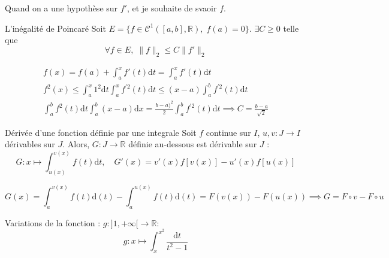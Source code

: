\begin{note}{}{}
  Quand on a une hypothèse sur $f'$, et je souhaite de svaoir $f$.
\end{note}


\begin{Example}{L'inégalité de Poincaré}{}
  Soit $E = \{ f \in \mathcal{C} ^{1}([a,b], \mathbb{R}), \; f(a) = 0\}$. $\exists C \ge 0$ telle que 
  \begin{equation}
    \forall f \in E, \; \| f \| _{2} \le C \| f' \|_2
  \end{equation}

\end{Example}

\begin{myproof}{}{}
\begin{gather}
  f(x) = f(a) + \int_{a}^{x} f'(t) \mathrm{d} t = \int_{a}^{x} f'(t) \mathrm{d}t \\ 
  f ^{2}(x) \le \int_{a}^{x} 1 ^{2} \mathrm{d} t \int_{a}^{x} f^{'2}(t) \mathrm{d} t \le (x-a) \int_{a}^{b} f ^{'2}(t) \mathrm{d} t \\ 
  \int_{a}^{b} f ^{2}(t) \mathrm{d} t \int_{a}^{b}(x-a) \mathrm{d}x  = \frac{b-a) ^{2}}{2}  \int_{a}^{b} f ^{'2}(t) \mathrm{d} t \implies C = \frac{b-a}{\sqrt{2}} 
\end{gather} 
\end{myproof}

\begin{Theorem}{Dérivée d'une fonction définie par une integrale}{}
Soit $f$ continue sur $I$, $u, v : J \to I$ dérivables sur $J$. Alors, $G : J \to \mathbb{R}$ définie au-dessous est dérivable sur $J$ :
\begin{equation}
  G : x \mapsto \int_{u(x)}^{v(x)} f(t) \mathrm{d} t, \quad G'(x) = v'(x) f[v(x)] - u'(x) f[u(x)]
\end{equation}



\end{Theorem}

\begin{myproof}{}{}
\begin{equation}
  G(x) = \int_{a}^{v(x)} f(t) \mathrm{d}(t) - \int_{a}^{u(x)} f(t) \mathrm{d}(t) = F(v(x)) - F(u(x)) \implies G = F \circ v - F \circ u
\end{equation}
\end{myproof}

\begin{Example}{}{}
  Variations de la fonction : $g : ]1, + \infty[ \to \mathbb{R}$:
\begin{equation}
  g : x \mapsto \int_{x}^{x ^{2}} \frac{\mathrm{d}t}{t ^{2}-1} 
\end{equation}
\end{Example}

